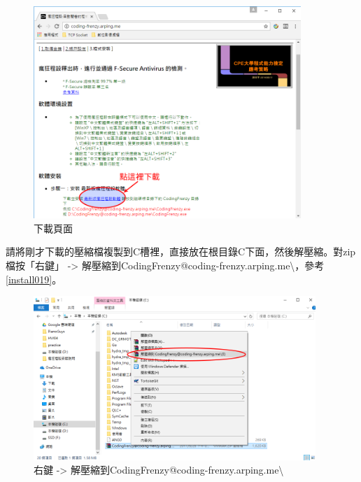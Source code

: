 		\begin{figure}[H]
			\centering
			\includegraphics[width=0.9\textwidth]{fig/install_and_setting/install_018}
			\caption{下載頁面}
			\label{install018}
		\end{figure}
		
		 請將剛才下載的壓縮檔複製到C槽裡，直接放在根目錄C下面，然後解壓縮。對zip檔按「右鍵」 -> 解壓縮到CodingFrenzy@coding-frenzy.arping.me\textbackslash，參考\autoref{install019}。
		\begin{figure}[H]
			\centering
			\includegraphics[width=0.95\textwidth]{fig/install_and_setting/install_019}
			\caption{右鍵 -> 解壓縮到CodingFrenzy@coding-frenzy.arping.me\textbackslash}
			\label{install019}
		\end{figure}

